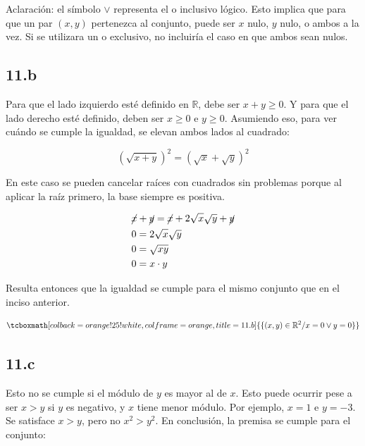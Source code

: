 \documentclass{article}
\newcommand{\hresult}[2]{\tcboxmath[colback=orange!25!white,colframe=orange, title=#1] {#2} }
\begin{document}
Aclaración: el símbolo $\vee$ representa el o inclusivo lógico. Esto implica que para que un par $(x,y)$ pertenezca al conjunto, puede ser $x$ nulo, $y$ nulo, o ambos a la vez. Si se utilizara un o exclusivo, no incluiría el caso en que ambos sean nulos.

\subsection*{11.b}
\label{subsec:11.b}

Para que el lado izquierdo esté definido en $\mathbb{R}$, debe ser $x + y \geq 0$. Y para que el lado derecho esté definido, deben ser $x \geq 0$ e $y \geq 0$. Asumiendo eso, para ver cuándo se cumple la igualdad, se elevan ambos lados al cuadrado:

\begin{equation}
\left( \sqrt{x+y} \right)^2 = \left( \sqrt{x} + \sqrt{y} \right)^2
\end{equation}

En este caso se pueden cancelar raíces con cuadrados sin problemas porque al aplicar la raíz primero, la base siempre es positiva.

\begin{subequations}
\begin{align}
& \cancel{x} + \cancel{y} = \cancel{x} + 2 \sqrt{x} \sqrt{y} + \cancel{y} \\
& 0 = 2 \sqrt{x} \sqrt{y} \\
& 0 = \sqrt{x y} \\
& 0 = x \cdot y
\end{align}
\end{subequations}

Resulta entonces que la igualdad se cumple para el mismo conjunto que en el inciso anterior.

\begin{equation}
\hresult{11.b}{ \{ (x,y) \in \mathbb{R}^2 / x = 0 \vee y = 0 \} }
\end{equation}

\subsection*{11.c}
\label{subsec:11.c}

Esto no se cumple si el módulo de $y$ es mayor al de $x$. Esto puede ocurrir pese a ser $x > y$ si $y$ es negativo, y $x$ tiene menor módulo. Por ejemplo, $x = 1$ e $y = -3$. Se satisface $x > y$, pero no $x^2 > y^2$. En conclusión, la premisa se cumple para el conjunto:
\end{document}
